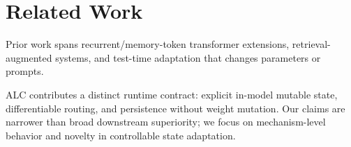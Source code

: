 \section{Related Work}
Prior work spans recurrent/memory-token transformer extensions, retrieval-augmented systems, and test-time adaptation that changes parameters or prompts.

ALC contributes a distinct runtime contract: explicit in-model mutable state, differentiable routing, and persistence without weight mutation. Our claims are narrower than broad downstream superiority; we focus on mechanism-level behavior and novelty in controllable state adaptation.
